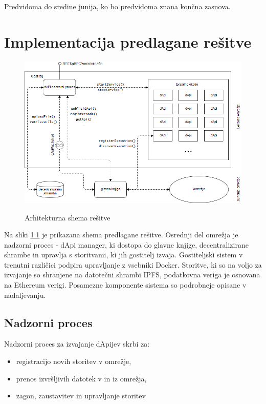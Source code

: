 \documentclass[a4paper, 12pt]{book}
\begin{document}
Predvidoma do sredine junija, ko bo predvidoma znana končna zasnova.

\chapter{Implementacija predlagane rešitve}
\label{ch5}

\begin{figure}[h]
\includegraphics[width=1.0\textwidth]{slike/dApi_sl.png}
\label{scheme}
\caption{Arhitekturna shema rešitve}
\end{figure}

Na sliki \ref{scheme} je prikazana shema predlagane rešitve. Osrednji del omrežja je nadzorni proces - 
dApi manager, ki dostopa do glavne knjige, decentralizirane shrambe in upravlja s storitvami, ki jih gostitelj izvaja.
Gostiteljski sistem v trenutni različici podpira upravljanje z vsebniki Docker.
Storitve, ki so na voljo za izvajanje so shranjene na datotečni shrambi IPFS, podatkovna veriga je 
osnovana na Ethereum verigi. Posamezne komponente sistema so podrobneje opisane v nadaljevanju.

\section{Nadzorni proces}
Nadzorni proces za izvajanje dApijev skrbi za:
\begin{itemize}
	\item registracijo novih storitev v omrežje, 
	\item prenos izvršljivih datotek v in iz omrežja,
	\item zagon, zaustavitev in upravljanje storitev
\end{itemize}
\end{document}
